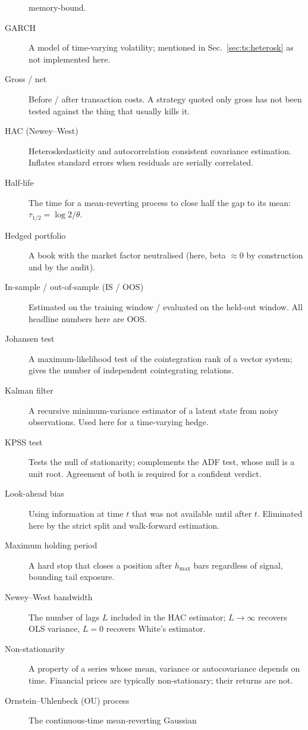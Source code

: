 \begin{description}
    memory-bound.
  \item[GARCH] A model of time-varying volatility; mentioned in Sec.~\ref{sec:ts:heterosk} as
    not implemented here.
  \item[Gross / net] Before / after transaction costs. A strategy quoted only gross has
    not been tested against the thing that usually kills it.
  \item[HAC (Newey--West)] Heteroskedasticity and autocorrelation consistent covariance
    estimation. Inflates standard errors when residuals are serially correlated.
  \item[Half-life] The time for a mean-reverting process to close half the gap to its
    mean: $\tau_{1/2}=\log 2/\theta$.
  \item[Hedged portfolio] A book with the market factor neutralised (here, beta $\approx0$
    by construction and by the  audit).
  \item[In-sample / out-of-sample (IS / OOS)] Estimated on the training window / evaluated
    on the held-out window. All headline numbers here are OOS.
  \item[Johansen test] A maximum-likelihood test of the cointegration rank of a vector
    system; gives the number of independent cointegrating relations.
  \item[Kalman filter] A recursive minimum-variance estimator of a latent state from noisy
    observations. Used here for a time-varying hedge.
  \item[KPSS test] Tests the null of stationarity; complements the ADF test, whose null is
    a unit root. Agreement of both is required for a confident verdict.
  \item[Look-ahead bias] Using information at time $t$ that was not available until after
    $t$. Eliminated here by the strict  split and walk-forward estimation.
  \item[Maximum holding period] A hard stop that closes a position after $h_{\max}$ bars
    regardless of signal, bounding tail exposure.
  \item[Newey--West bandwidth] The number of lags $L$ included in the HAC estimator;
    $L\to\infty$ recovers OLS variance, $L=0$ recovers White's estimator.
  \item[Non-stationarity] A property of a series whose mean, variance or autocovariance
    depends on time. Financial prices are typically non-stationary; their returns are not.
  \item[Ornstein--Uhlenbeck (OU) process] The continuous-time mean-reverting Gaussian

\end{description}
